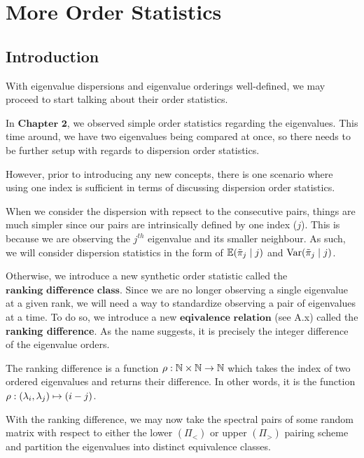 \section{More Order Statistics}
\subsection{Introduction}
With eigenvalue dispersions and eigenvalue orderings well-defined, we may proceed to start talking about their order statistics. 

In $\textbf{Chapter 2}$, we observed simple order statistics regarding the eigenvalues. This time around, we have two eigenvalues being compared at once, so there needs to be further setup with regards to dispersion order statistics.

However, prior to introducing any new concepts, there is one scenario where using one index is sufficient in terms of discussing dispersion order statistics.

\begin{remark}
When we consider the dispersion with repsect to the consecutive pairs, things are much simpler since our pairs are intrinsically defined by one index ($j$). This is because we are observing the $j^{th}$ eigenvalue and its smaller neighbour. As such, we will consider dispersion statistics in the form of $\mathbb{E}({\tilde{\pi}}_j \mid j)$ and $\text{Var}({\tilde{\pi}}_j \mid j)$.
\end{remark}

Otherwise, we introduce a new synthetic order statistic called the $\textbf{ranking difference class}$. Since we are no longer observing a single eigenvalue at a given rank, we will need a way to standardize observing a pair of eigenvalues at a time. To do so, we introduce a new $\textbf{eqivalence relation}$ (see A.x) called the \textbf{ranking difference}. As the name suggests, it is precisely the integer difference of the eigenvalue orders.

\begin{definition}
The ranking difference is a function ${\rho}: \mathbb{N} \times \mathbb{N} \to \mathbb{N}$ which takes the index of two ordered eigenvalues and returns their difference. In other words, it is the function ${\rho}: (\lambda_i,\lambda_j) \mapsto (i - j)$.
\end{definition}

With the ranking difference, we may now take the spectral pairs of some random matrix with respect to either the lower $(\Pi_<)$ or upper $(\Pi_>)$ pairing scheme and partition the eigenvalues into distinct equivalence classes. 

